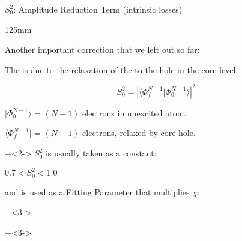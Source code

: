\begin{slide}{$S_0^2$:  Amplitude Reduction Term (intrinsic losses)}

  \vspace{1mm}
  \begin{cenpage} {125mm}

    Another important correction that we left out so far:\vmm

    The {} is due to the relaxation of the
    {} to the hole in the
    core level:

   \vmm
   \[
   S_0^2 =  {  |{\langle \Phi^{N-1}_f |\Phi^{N-1}_0 \rangle}|^2}
   \]

   \vmm

   ${| \Phi^{N-1}_0 \rangle }$ = $(N-1)$ electrons in unexcited atom.

   ${\langle \Phi^{N-1}_f|}$   = $(N-1)$ electrons, relaxed by core-hole.

   \vmm

   \onslide+<2->
   ${S_0^2}$ is usually taken as a constant:
   \begin{postitbox}{25mm}   $ 0.7 < S_0^2 < 1.0 $ \end{postitbox}

  and is used as a Fitting Parameter that multiplies {$\chi$}:

  \vmm  \onslide+<3->

  \begin{center}
    {}
  \end{center}

  \onslide+<3->

  \begin{postitbox}{95mm} 
  \end{postitbox}

\end{cenpage}
\vfill
\end{slide}
